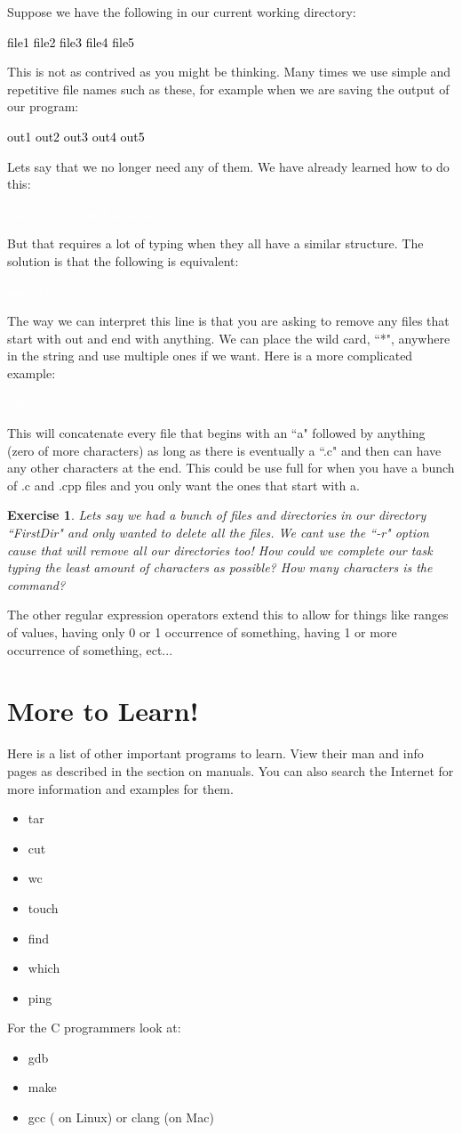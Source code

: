 \documentclass{book}
\newcommand{\commandline}[1]{\begin{center} \colorbox{Dark}{\textcolor{white}{#1}} \end{center}}
\newcommand{\exampleout}[1]{\begin{center} \colorbox{Light}{\textcolor{black}{#1}} \end{center}}
\newtheorem{ex}{Exercise}[chapter]
\begin{document}
Suppose we have the following in our current working directory:
\exampleout{file1 file2 file3 file4 file5}
This is not as contrived as you might be thinking. Many times we use simple and repetitive file names such as these, for example when we are saving the output of our program:
\exampleout{out1 out2 out3 out4 out5}
Lets say that we no longer need any of them. We have already learned how to do this:
\commandline{rm out1 out2 out3 out4 out5}
But that requires a lot of typing when they all have a similar structure. The solution is that the following is equivalent:
\commandline{rm out*}
The way we can interpret this line is that you are asking to remove any files that start with out and end with anything. We can place the wild card, ``*", anywhere in the string and use multiple ones if we want. Here is a more complicated example:
\commandline{cat a*.c*}
This will concatenate every file that begins with an ``a" followed by anything (zero of more characters) as long as there is eventually a ``.c" and then can have any other characters at the end. This could be use full for when you have a bunch of .c and .cpp files and you only want the ones that start with a.
\begin{ex}
    Lets say we had a bunch of files and directories in our directory ``FirstDir" and only wanted to delete all the files. We cant use the ``-r" option cause that will remove all our directories too! How could we complete our task typing the least amount of characters as possible? How many characters is the command?
\end{ex}
The other regular expression operators extend this to allow for things like ranges of values, having only 0 or 1 occurrence of something, having 1 or more occurrence of something, ect... 

\section{More to Learn!}
Here is a list of other important programs to learn. View their man and info pages as described in the section on manuals. You can also search the Internet for more information and examples for them.
\begin{itemize}
		\item{tar}
		\item{cut}
		\item{wc}
		\item{touch}
		\item{find}
		\item{which}
		\item{ping}
\end{itemize}
For the C programmers look at:
\begin{itemize}
		\item{gdb}
		\item{make}
		\item{gcc ( on Linux) or clang (on Mac)}
\end{itemize}
\end{document}
